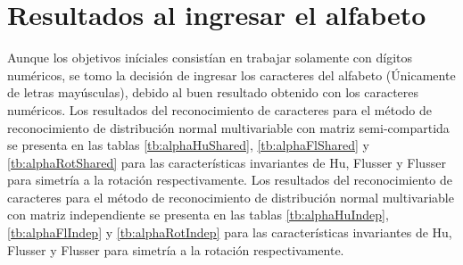 \documentclass[a4paper, 11pt, oneside]{report}
\begin{document}
\section{Resultados al ingresar el alfabeto}
Aunque los objetivos iníciales consistían en trabajar solamente con dígitos numéricos, se tomo la decisión de ingresar los caracteres del alfabeto (Únicamente de letras mayúsculas), debido al buen resultado obtenido con los caracteres numéricos. Los resultados del reconocimiento de caracteres para el método de reconocimiento de distribución normal multivariable con matriz semi-compartida se presenta en las tablas \ref{tb:alphaHuShared}, \ref{tb:alphaFlShared} y \ref{tb:alphaRotShared} para las características invariantes de Hu, Flusser y Flusser para simetría a la rotación respectivamente. Los resultados del reconocimiento de caracteres para el método de reconocimiento de distribución normal multivariable con matriz independiente se presenta en las tablas \ref{tb:alphaHuIndep}, \ref{tb:alphaFlIndep} y \ref{tb:alphaRotIndep} para las características invariantes de Hu, Flusser y Flusser para simetría a la rotación respectivamente.
\end{document}
